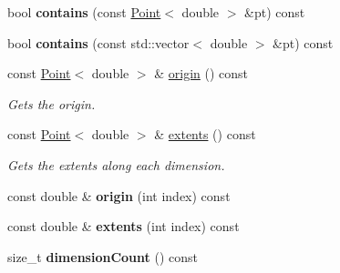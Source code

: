 \begin{DoxyCompactItemize}
\item 
\hypertarget{classrepast_1_1_grid_dimensions_ac364611e0c8dd54b0df8ef753a1c3080}{bool {\bfseries contains} (const \hyperlink{classrepast_1_1_point}{Point}$<$ double $>$ \&pt) const }\label{classrepast_1_1_grid_dimensions_ac364611e0c8dd54b0df8ef753a1c3080}

\item 
\hypertarget{classrepast_1_1_grid_dimensions_ab1f3412888524fab6d6c3c517b27da85}{bool {\bfseries contains} (const std\-::vector$<$ double $>$ \&pt) const }\label{classrepast_1_1_grid_dimensions_ab1f3412888524fab6d6c3c517b27da85}

\item 
\hypertarget{classrepast_1_1_grid_dimensions_a0ec32ce3994e9903af7068aa9fd3f0f6}{const \hyperlink{classrepast_1_1_point}{Point}$<$ double $>$ \& \hyperlink{classrepast_1_1_grid_dimensions_a0ec32ce3994e9903af7068aa9fd3f0f6}{origin} () const }\label{classrepast_1_1_grid_dimensions_a0ec32ce3994e9903af7068aa9fd3f0f6}

\begin{DoxyCompactList}\small\item\em Gets the origin. \end{DoxyCompactList}\item 
\hypertarget{classrepast_1_1_grid_dimensions_abd4875c315a9420c18f0c369f3a8af9a}{const \hyperlink{classrepast_1_1_point}{Point}$<$ double $>$ \& \hyperlink{classrepast_1_1_grid_dimensions_abd4875c315a9420c18f0c369f3a8af9a}{extents} () const }\label{classrepast_1_1_grid_dimensions_abd4875c315a9420c18f0c369f3a8af9a}

\begin{DoxyCompactList}\small\item\em Gets the extents along each dimension. \end{DoxyCompactList}\item 
\hypertarget{classrepast_1_1_grid_dimensions_ac30a2660eff0158ca306fcff807f57a7}{const double \& {\bfseries origin} (int index) const }\label{classrepast_1_1_grid_dimensions_ac30a2660eff0158ca306fcff807f57a7}

\item 
\hypertarget{classrepast_1_1_grid_dimensions_ae7104e85e069a7108eba8db95ad11a54}{const double \& {\bfseries extents} (int index) const }\label{classrepast_1_1_grid_dimensions_ae7104e85e069a7108eba8db95ad11a54}

\item 
\hypertarget{classrepast_1_1_grid_dimensions_a7961c67064727f34d52045385517c024}{size\-\_\-t {\bfseries dimension\-Count} () const }\label{classrepast_1_1_grid_dimensions_a7961c67064727f34d52045385517c024}

\end{DoxyCompactItemize}
